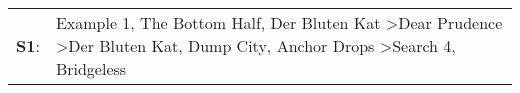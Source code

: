 \begin{supertabular}{p{0.03\textwidth}p{0.92\textwidth}}
 \textbf{S1}:  &  Example 1\textsuperscript{}, \enspace The Bottom Half\textsuperscript{}, \enspace Der Bluten Kat\textsuperscript{} \textgreater \enspace Dear Prudence\textsuperscript{} \textgreater \enspace Der Bluten Kat\textsuperscript{}, \enspace Dump City\textsuperscript{}, \enspace Anchor Drops\textsuperscript{} \textgreater \enspace Search 4\textsuperscript{}, \enspace Bridgeless\textsuperscript{}  \enspace  \\
\end{supertabular}
